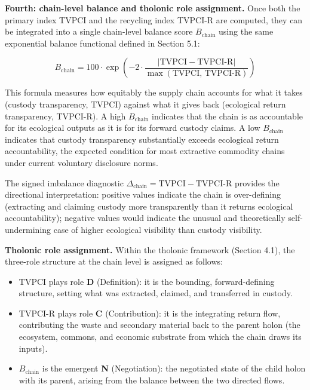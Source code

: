 \documentclass[
  11pt,
  letterpaper,
]{article}
\providecommand{\tightlist}{%
  \setlength{\itemsep}{0pt}\setlength{\parskip}{0pt}}
\begin{document}
\textbf{Fourth: chain-level balance and tholonic role assignment.} Once
both the primary index TVPCI and the recycling index TVPCI-R are
computed, they can be integrated into a single chain-level balance score
\(B_{\text{chain}}\) using the same exponential balance functional
defined in Section 5.1:

\[B_{\text{chain}} = 100 \cdot \exp\!\left(-2 \cdot \frac{|\text{TVPCI} - \text{TVPCI-R}|}{\max(\text{TVPCI},\,\text{TVPCI-R})}\right)\]

This formula measures how equitably the supply chain accounts for what
it takes (custody transparency, TVPCI) against what it gives back
(ecological return transparency, TVPCI-R). A high \(B_{\text{chain}}\)
indicates that the chain is as accountable for its ecological outputs as
it is for its forward custody claims. A low \(B_{\text{chain}}\)
indicates that custody transparency substantially exceeds ecological
return accountability, the expected condition for most extractive
commodity chains under current voluntary disclosure norms.

The signed imbalance diagnostic
\(\Delta_{\text{chain}} = \text{TVPCI} - \text{TVPCI-R}\) provides the
directional interpretation: positive values indicate the chain is
over-defining (extracting and claiming custody more transparently than
it returns ecological accountability); negative values would indicate
the unusual and theoretically self-undermining case of higher ecological
visibility than custody visibility.

\textbf{Tholonic role assignment.} Within the tholonic framework
(Section 4.1), the three-role structure at the chain level is assigned
as follows:

\begin{itemize}
\tightlist
\item
  TVPCI plays role \textbf{D} (Definition): it is the bounding,
  forward-defining structure, setting what was extracted, claimed, and
  transferred in custody.
\item
  TVPCI-R plays role \textbf{C} (Contribution): it is the integrating
  return flow, contributing the waste and secondary material back to the
  parent holon (the ecosystem, commons, and economic substrate from
  which the chain draws its inputs).
\item
  \(B_{\text{chain}}\) is the emergent \textbf{N} (Negotiation): the
  negotiated state of the child holon with its parent, arising from the
  balance between the two directed flows.
\end{itemize}
\end{document}
